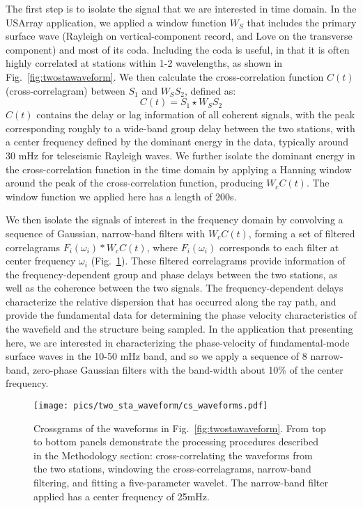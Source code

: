 \documentclass{gji}
\begin{document}
The first step is to isolate the signal that we are interested in time domain. In the USArray application, we applied a window function $W_S$ that includes the primary surface wave (Rayleigh on vertical-component record, and Love on the transverse component) and most of its coda. Including the coda is useful, in that it is often highly correlated at stations within 1-2 wavelengths, as shown in Fig.~\ref{fig:twostawaveform}. We then calculate the cross-correlation function $C(t)$ (cross-correlagram) between $S_1$ and $W_SS_2$, defined as:
\[
C(t) = S_1 \star W_S S_2
\]
$C(t)$ contains the delay or lag information of all coherent signals, with the peak corresponding roughly to a wide-band group delay between the two stations, with a center frequency defined by the dominant energy in the data, typically around 30 mHz for teleseismic Rayleigh waves. We further isolate the dominant energy in the cross-correlation function in the time domain by applying a Hanning window around the peak of the cross-correlation function, producing $W_cC(t)$. The window function we applied here has a length of 200s.

We then isolate the signals of interest in the frequency domain by convolving a sequence of Gaussian, narrow-band filters with $W_cC(t)$, forming a set of filtered correlagrams $F_i(\omega_i) \ast W_c C(t)$, where $F_i(\omega_i)$ corresponds to each filter at center frequency $\omega_i$ (Fig.~\ref{fig:cswaveform}). These filtered correlagrams provide information of the frequency-dependent group and phase delays between the two stations, as well as the coherence between the two signals. The frequency-dependent delays characterize the relative dispersion that has occurred along the ray path, and provide the fundamental data for determining the phase velocity characteristics of the wavefield and the structure being sampled.  In the application that presenting here, we are interested in characterizing the phase-velocity of fundamental-mode surface waves in the 10-50 mHz band, and so we apply a sequence of 8 narrow-band, zero-phase Gaussian filters with the band-width about 10\% of the center frequency.

\begin{figure}
	\texttt{[image: pics/two\_sta\_waveform/cs\_waveforms.pdf]}
	\caption{Crossgrams of the waveforms in Fig.~\ref{fig:twostawaveform}. From top to bottom panels demonstrate the processing procedures described in the Methodology section: cross-correlating the waveforms from the two stations, windowing the cross-correlagrams, narrow-band filtering, and fitting a five-parameter wavelet. The narrow-band filter applied has a center frequency of 25mHz.}
	\label{fig:cswaveform}
\end{figure}
\end{document}
